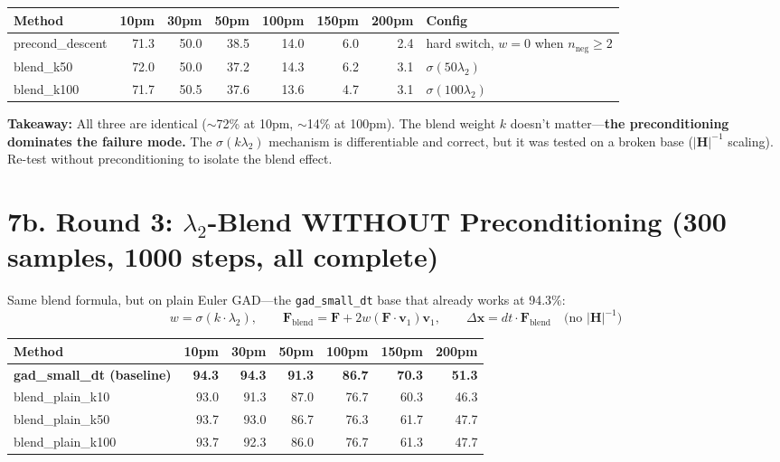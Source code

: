 \documentclass[11pt]{article}
\begin{document}
\begin{tabular}{l*{6}{r}l}
\toprule
Method & 10pm & 30pm & 50pm & 100pm & 150pm & 200pm & Config \\
\midrule
precond\_descent    & 71.3 & 50.0 & 38.5 & 14.0 & 6.0 & 2.4 & hard switch, $w=0$ when $n_{\text{neg}}\geq 2$ \\
blend\_k50          & 72.0 & 50.0 & 37.2 & 14.3 & 6.2 & 3.1 & $\sigma(50\lambda_2)$ \\
blend\_k100         & 71.7 & 50.5 & 37.6 & 13.6 & 4.7 & 3.1 & $\sigma(100\lambda_2)$ \\
\bottomrule
\end{tabular}

\textbf{Takeaway:} All three are identical ($\sim$72\% at 10pm, $\sim$14\% at 100pm). The blend
weight $k$ doesn't matter---\textbf{the preconditioning dominates the failure mode.}
The $\sigma(k\lambda_2)$ mechanism is differentiable and correct, but it was tested on a
broken base ($|\mathbf{H}|^{-1}$ scaling). Re-test without preconditioning to isolate the
blend effect.

\section*{7b. Round 3: $\lambda_2$-Blend WITHOUT Preconditioning \small(300 samples, 1000 steps, all complete)}

Same blend formula, but on plain Euler GAD---the \texttt{gad\_small\_dt} base that already works at 94.3\%:
\[
w = \sigma(k \cdot \lambda_2), \qquad
\mathbf{F}_{\text{blend}} = \mathbf{F} + 2w(\mathbf{F}\cdot\mathbf{v}_1)\mathbf{v}_1, \qquad
\Delta\mathbf{x} = dt \cdot \mathbf{F}_{\text{blend}} \quad \text{(no $|\mathbf{H}|^{-1}$)}
\]

\begin{tabular}{l*{6}{r}}
\toprule
Method & 10pm & 30pm & 50pm & 100pm & 150pm & 200pm \\
\midrule
\textbf{gad\_small\_dt (baseline)} & \textbf{94.3} & \textbf{94.3} & \textbf{91.3} & \textbf{86.7} & \textbf{70.3} & \textbf{51.3} \\
blend\_plain\_k10  & 93.0 & 91.3 & 87.0 & 76.7 & 60.3 & 46.3 \\
blend\_plain\_k50  & 93.7 & 93.0 & 86.7 & 76.3 & 61.7 & 47.7 \\
blend\_plain\_k100 & 93.7 & 92.3 & 86.0 & 76.7 & 61.3 & 47.7 \\
\bottomrule
\end{tabular}
\end{document}
